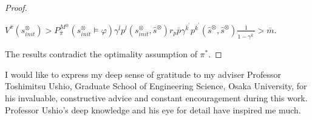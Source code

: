 \documentclass[a4j,12pt,oneside,openany,english]{jsbook}
\begin{document}
\begin{proof}
\begin{enumerate}
     $V^{\bar{\pi}}(s^{\otimes}_{init}) > P^{M^{\otimes}}_{\bar{\pi}}(s^{\otimes}_{init} \models \varphi) \gamma^{\bar{l}} p^{\bar{l}}(s^{\otimes}_{init}, \hat{s}^{\otimes}) r_p \bar{p} \gamma^{\bar{k}^{\prime}} p^{\bar{k}^{\prime}}(\hat{s}^{\otimes},\hat{s}^{\otimes}) \frac{1}{ 1 - \gamma^{\bar{k}^{\prime}} } > \bar{m}$.
  \end{enumerate}

The results contradict the optimality assumption of $\pi^{\ast}$.
\end{proof}

\begin{acknowledgement}
	I would like to express my deep sense of gratitude to my adviser Professor
	Toshimitsu Ushio, Graduate School of Engineering Science, Osaka University,
	for his invaluable, constructive advice and constant encouragement during this work.
	Professor Ushio's deep knowledge and his eye for detail have inspired me much.
\end{acknowledgement}
\end{document}
